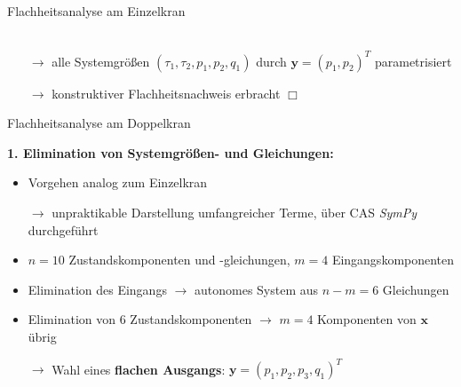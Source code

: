 \documentclass[
	ngerman,
	10pt,				%
	aspectratio=169, 	%
	xcolor=dvipsnames
]{beamer}
\begin{document}
\begin{frame}[t,fragile,label=Flachheit_Einzelkran_new3]{\large Flachheitsanalyse am Einzelkran}
\begin{itemize}
\begin{align*}
		\end{align*}
	\end{itemize}
	\begin{itemize}
		\pause
		\item[$\rightarrow$] alle Systemgrößen $(\tau_1, \tau_2, p_1, p_2, q_1)$ durch $\mathbf{y} = (p_1, p_2)^T$ parametrisiert
		\pause
		\item[$\rightarrow$] konstruktiver Flachheitsnachweis erbracht \quad $\Box$
	\end{itemize}
	
	
\end{frame}


\begin{frame}[t,fragile,label=Flachheit_Doppelkran_1]{\large Flachheitsanalyse am Doppelkran}
	
	\textbf{1. Elimination von Systemgrößen- und Gleichungen:}
	
	\begin{itemize}
		\item Vorgehen analog zum Einzelkran
		\pause
		\item[$\rightarrow$] unpraktikable Darstellung umfangreicher Terme, über CAS \textit{SymPy} durchgeführt
		\pause
		\bigskip
		\item $n = 10$ Zustandskomponenten und -gleichungen, $m = 4$ Eingangskomponenten
		\pause
		\item Elimination des Eingangs $\rightarrow$ autonomes System aus $n - m = 6$ Gleichungen
		\pause
		\item Elimination von 6 Zustandskomponenten $\rightarrow$ $m = 4$ Komponenten von $\mathbf{x}$ übrig
		\pause
		\item[$\rightarrow$] Wahl eines \textbf{flachen Ausgangs}: $\mathbf{y} = (p_1, p_2, p_3, q_1)^T$
	\end{itemize}
	
\end{frame}

\end{document}
